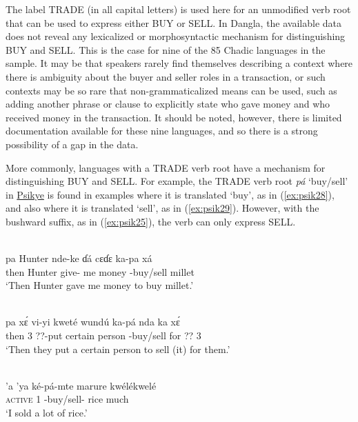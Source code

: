 The label TRADE (in all capital letters) is used here for an unmodified verb root that can be used to express either BUY or SELL. In Dangla, the available data does not reveal any lexicalized or morphosyntactic mechanism for distinguishing BUY and SELL. This is the case for nine of the 85 Chadic languages in the sample. It may be that speakers rarely find themselves describing a context where there is ambiguity about the buyer and seller roles in a transaction, or such contexts may be so rare that non-grammaticalized means can be used, such as adding another phrase or clause to explicitly state who gave money and who received money in the transaction. It should be noted, however, there is limited documentation available for these nine languages, and so there is a strong possibility of a gap in the data.  

More commonly, languages with a TRADE verb root have a mechanism for distinguishing BUY and SELL. For example, the TRADE verb root \textit{pá} `buy/sell' in \hyperref[psik]{Psikye} is found in examples where it is translated `buy', as in (\ref{ex:psik28}), and also where it is translated `sell', as in (\ref{ex:psik29}). However, with the bushward suffix, as in (\ref{ex:psik25}), the verb can only express SELL.

\ea\label{ex:psik28}
 \\
\gll pa Hunter nde-ke ɗá cɛɗɛ ka-pa xá	\\
then Hunter give- me money -buy/sell millet \\
\glt `Then Hunter gave me money to buy millet.'

\ex\label{ex:psik29}
 \\
\gll pa xɛ́ vi-yi kweté wundú ka-pá nda ka xɛ́ 	\\
then 3 ??-put certain person -buy/sell for ?? 3 \\
\glt `Then they put a certain person to sell (it) for them.'
\z 

\ea\label{ex:psik25}
 \\
\gll 'a 'ya ké-pá-mte marure kwélékwelé	\\
\textsc{active} 1 -buy/sell- rice much \\
\glt `I sold a lot of rice.'
\z 

